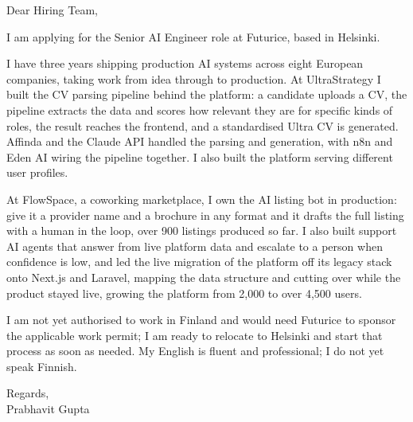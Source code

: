 \documentclass[a4paper,11pt]{article}
\begin{document}
Dear Hiring Team,

I am applying for the Senior AI Engineer role at Futurice, based in Helsinki.

I have three years shipping production AI systems across eight European companies, taking work from idea through to production. At UltraStrategy I built the CV parsing pipeline behind the platform: a candidate uploads a CV, the pipeline extracts the data and scores how relevant they are for specific kinds of roles, the result reaches the frontend, and a standardised Ultra CV is generated. Affinda and the Claude API handled the parsing and generation, with n8n and Eden AI wiring the pipeline together. I also built the platform serving different user profiles.

At FlowSpace, a coworking marketplace, I own the AI listing bot in production: give it a provider name and a brochure in any format and it drafts the full listing with a human in the loop, over 900 listings produced so far. I also built support AI agents that answer from live platform data and escalate to a person when confidence is low, and led the live migration of the platform off its legacy stack onto Next.js and Laravel, mapping the data structure and cutting over while the product stayed live, growing the platform from 2,000 to over 4,500 users.

I am not yet authorised to work in Finland and would need Futurice to sponsor the applicable work permit; I am ready to relocate to Helsinki and start that process as soon as needed. My English is fluent and professional; I do not yet speak Finnish.

Regards,\\
Prabhavit Gupta
\end{document}
